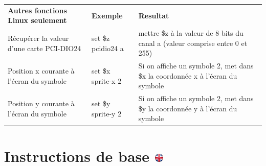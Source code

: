 \documentclass[
]{book}
\begin{document}
\begin{longtable}[]{@{}lll@{}}
\toprule
\endhead
\begin{minipage}[t]{0.29\columnwidth}\raggedright
\textbf{Autres fonctions Linux seulement}\strut
\end{minipage} & \begin{minipage}[t]{0.15\columnwidth}\raggedright
\textbf{Exemple}\strut
\end{minipage} & \begin{minipage}[t]{0.47\columnwidth}\raggedright
\textbf{Resultat}\strut
\end{minipage}\tabularnewline
\begin{minipage}[t]{0.29\columnwidth}\raggedright
Récupérer la valeur d'une carte PCI-DIO24\strut
\end{minipage} & \begin{minipage}[t]{0.15\columnwidth}\raggedright
set \$z pcidio24 a\strut
\end{minipage} & \begin{minipage}[t]{0.47\columnwidth}\raggedright
mettre \$z à la valeur de 8 bits du canal a (valeur comprise entre 0 et
255)\strut
\end{minipage}\tabularnewline
\begin{minipage}[t]{0.29\columnwidth}\raggedright
Position x courante à l'écran du symbole\strut
\end{minipage} & \begin{minipage}[t]{0.15\columnwidth}\raggedright
set \$x sprite-x 2\strut
\end{minipage} & \begin{minipage}[t]{0.47\columnwidth}\raggedright
Si on affiche un symbole 2, met dans \$x la coordonnée x à l'écran du
symbole\strut
\end{minipage}\tabularnewline
\begin{minipage}[t]{0.29\columnwidth}\raggedright
Position y courante à l'écran du symbole\strut
\end{minipage} & \begin{minipage}[t]{0.15\columnwidth}\raggedright
set \$y sprite-y 2\strut
\end{minipage} & \begin{minipage}[t]{0.47\columnwidth}\raggedright
Si on affiche un symbole 2, met dans \$y la coordonnée y à l'écran du
symbole\strut
\end{minipage}\tabularnewline
\bottomrule
\end{longtable}

\hypertarget{instructions-de-base}{%
\section[Instructions de base ]{\texorpdfstring{Instructions de base
\href{https://www.psytoolkit.org/doc3.2.0/syntax.html\#_commonly_used_instructions}{\protect\includegraphics{img/ukflag.png}}}{Instructions de base }}\label{instructions-de-base}}
\end{document}

